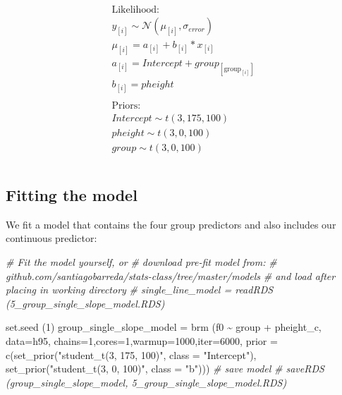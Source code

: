 \documentclass[
]{book}
\newenvironment{Shaded}{\begin{snugshade}}{\end{snugshade}}
\newcommand{\AttributeTok}[1]{\textcolor[rgb]{0.77,0.63,0.00}{#1}}
\newcommand{\CommentTok}[1]{\textcolor[rgb]{0.56,0.35,0.01}{\textit{#1}}}
\newcommand{\DecValTok}[1]{\textcolor[rgb]{0.00,0.00,0.81}{#1}}
\newcommand{\FunctionTok}[1]{\textcolor[rgb]{0.00,0.00,0.00}{#1}}
\newcommand{\NormalTok}[1]{#1}
\newcommand{\OtherTok}[1]{\textcolor[rgb]{0.56,0.35,0.01}{#1}}
\newcommand{\SpecialCharTok}[1]{\textcolor[rgb]{0.00,0.00,0.00}{#1}}
\newcommand{\StringTok}[1]{\textcolor[rgb]{0.31,0.60,0.02}{#1}}
\begin{document}
\begin{equation}
\begin{split}
\\
\textrm{Likelihood:} \\
y_{[i]} \sim \mathcal{N}(\mu_{[i]},\sigma_{error}) \\
\mu_{[i]} = a_{[i]} + b_{[i]} * x_{[i]}  \\ 
a_{[i]} = Intercept + group_{[\mathrm{group}_{[i]}]} \\
b_{[i]} = pheight \\ \\
\textrm{Priors:} \\
Intercept \sim t(3, 175, 100) \\
pheight \sim t(3, 0, 100) \\ 
group \sim t(3, 0, 100) \\ 
\\
\end{split}
\label{eq:511}
\end{equation}

\hypertarget{fitting-the-model-4}{%
\subsection{Fitting the model}\label{fitting-the-model-4}}

We fit a model that contains the four group predictors and also includes our continuous predictor:

\begin{Shaded}
\begin{Highlighting}[]
\CommentTok{\# Fit the model yourself, or}
\CommentTok{\# download pre{-}fit model from: }
\CommentTok{\# github.com/santiagobarreda/stats{-}class/tree/master/models}
\CommentTok{\# and load after placing in working directory}
\CommentTok{\# single\_line\_model = readRDS (\textquotesingle{}5\_group\_single\_slope\_model.RDS\textquotesingle{})}

\FunctionTok{set.seed}\NormalTok{ (}\DecValTok{1}\NormalTok{)}
\NormalTok{group\_single\_slope\_model }\OtherTok{=}
  \FunctionTok{brm}\NormalTok{ (f0 }\SpecialCharTok{\textasciitilde{}}\NormalTok{ group }\SpecialCharTok{+}\NormalTok{ pheight\_c, }
       \AttributeTok{data=}\NormalTok{h95, }\AttributeTok{chains=}\DecValTok{1}\NormalTok{,}\AttributeTok{cores=}\DecValTok{1}\NormalTok{,}\AttributeTok{warmup=}\DecValTok{1000}\NormalTok{,}\AttributeTok{iter=}\DecValTok{6000}\NormalTok{,}
       \AttributeTok{prior =} \FunctionTok{c}\NormalTok{(}\FunctionTok{set\_prior}\NormalTok{(}\StringTok{"student\_t(3, 175, 100)"}\NormalTok{, }\AttributeTok{class =} \StringTok{"Intercept"}\NormalTok{),}
                 \FunctionTok{set\_prior}\NormalTok{(}\StringTok{"student\_t(3, 0, 100)"}\NormalTok{, }\AttributeTok{class =} \StringTok{"b"}\NormalTok{)))}
\CommentTok{\# save model}
\CommentTok{\# saveRDS (group\_single\_slope\_model, \textquotesingle{}5\_group\_single\_slope\_model.RDS\textquotesingle{})}
\end{Highlighting}
\end{Shaded}
\end{document}
